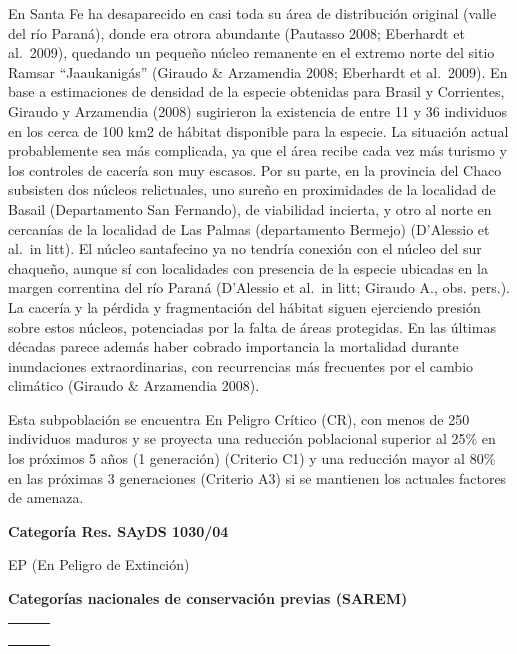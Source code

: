 \documentclass[
  x11names]{article}
\begin{document}
En Santa Fe ha desaparecido en casi toda su área de distribución
original (valle del río Paraná), donde era otrora abundante (Pautasso
2008; Eberhardt et al.~2009), quedando un pequeño núcleo remanente en el
extremo norte del sitio Ramsar ``Jaaukanigás'' (Giraudo \& Arzamendia
2008; Eberhardt et al.~2009). En base a estimaciones de densidad de la
especie obtenidas para Brasil y Corrientes, Giraudo y Arzamendia (2008)
sugirieron la existencia de entre 11 y 36 individuos en los cerca de 100
km2 de hábitat disponible para la especie. La situación actual
probablemente sea más complicada, ya que el área recibe cada vez más
turismo y los controles de cacería son muy escasos. Por su parte, en la
provincia del Chaco subsisten dos núcleos relictuales, uno sureño en
proximidades de la localidad de Basail (Departamento San Fernando), de
viabilidad incierta, y otro al norte en cercanías de la localidad de Las
Palmas (departamento Bermejo) (D'Alessio et al.~in litt). El núcleo
santafecino ya no tendría conexión con el núcleo del sur chaqueño,
aunque sí con localidades con presencia de la especie ubicadas en la
margen correntina del río Paraná (D'Alessio et al.~in litt; Giraudo A.,
obs. pers.). La cacería y la pérdida y fragmentación del hábitat siguen
ejerciendo presión sobre estos núcleos, potenciadas por la falta de
áreas protegidas. En las últimas décadas parece además haber cobrado
importancia la mortalidad durante inundaciones extraordinarias, con
recurrencias más frecuentes por el cambio climático (Giraudo \&
Arzamendia 2008).

Esta subpoblación se encuentra En Peligro Crítico (CR), con menos de 250
individuos maduros y se proyecta una reducción poblacional superior al
25\% en los próximos 5 años (1 generación) (Criterio C1) y una reducción
mayor al 80\% en las próximas 3 generaciones (Criterio A3) si se
mantienen los actuales factores de amenaza.

\textbf{Categoría Res. SAyDS 1030/04}

EP (En Peligro de Extinción)

\textbf{Categorías nacionales de conservación previas (SAREM)}

\begin{tabu} to 
\toprule
\textbf{} &  & \\
\bottomrule
\end{tabu}

\begin{tabu} to 
\toprule
\textbf{} &  & \\
\bottomrule
\end{tabu}
\end{document}
